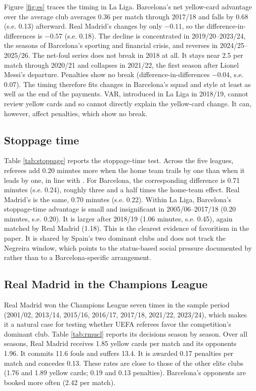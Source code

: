 Figure \ref{fig:es} traces the timing in La Liga. Barcelona's net yellow-card advantage over the average club averages 0.36 per match through 2017/18 and falls by 0.68 (s.e. 0.13) afterward. Real Madrid's changes by only $-0.11$, so the difference-in-differences is $-0.57$ (s.e. 0.18). The decline is concentrated in 2019/20--2023/24, the seasons of Barcelona's sporting and financial crisis, and reverses in 2024/25--2025/26. The net-foul series does not break in 2018 at all. It stays near 2.5 per match through 2020/21 and collapses in 2021/22, the first season after Lionel Messi's departure. Penalties show no break (difference-in-differences $-0.04$, s.e. 0.07). The timing therefore fits changes in Barcelona's squad and style at least as well as the end of the payments. VAR, introduced in La Liga in 2018/19, cannot review yellow cards and so cannot directly explain the yellow-card change. It can, however, affect penalties, which show no break.

\subsection{Stoppage time}

Table \ref{tab:stoppage} reports the stoppage-time test. Across the five leagues, referees add 0.20 minutes more when the home team trails by one than when it leads by one, in line with \citet{garicano2005favoritism}. For Barcelona, the corresponding difference is 0.71 minutes (s.e. 0.24), roughly three and a half times the home-team effect. Real Madrid's is the same, 0.70 minutes (s.e. 0.22). Within La Liga, Barcelona's stoppage-time advantage is small and insignificant in 2005/06--2017/18 (0.20 minutes, s.e. 0.20). It is larger after 2018/19 (1.06 minutes, s.e. 0.45), again matched by Real Madrid (1.18). This is the clearest evidence of favoritism in the paper. It is shared by Spain's two dominant clubs and does not track the Negreira window, which points to the status-based social pressure documented by \citet{garicano2005favoritism} rather than to a Barcelona-specific arrangement.

\subsection{Real Madrid in the Champions League}

Real Madrid won the Champions League seven times in the sample period (2001/02, 2013/14, 2015/16, 2016/17, 2017/18, 2021/22, 2023/24), which makes it a natural case for testing whether UEFA referees favor the competition's dominant club. Table \ref{tab:rmucl} reports its decisions season by season. Over all seasons, Real Madrid receives 1.85 yellow cards per match and its opponents 1.96. It commits 11.6 fouls and suffers 13.4. It is awarded 0.17 penalties per match and concedes 0.13. These rates are close to those of the other elite clubs (1.76 and 1.89 yellow cards; 0.19 and 0.13 penalties). Barcelona's opponents are booked more often (2.42 per match).

